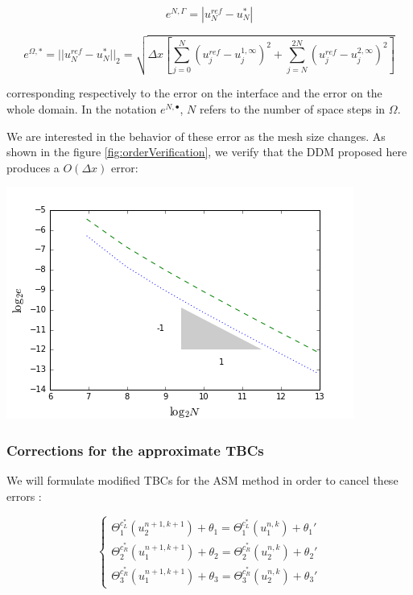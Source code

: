 \begin{equation}
	e^{N,\Gamma} = |u^{ref}_N - u^{*}_N|
\end{equation}

\begin{equation}
	\label{eq:errorDDM}
	e^{\Omega,*} = ||u^{ref}_N - u^{*}_N||_2 = \sqrt{\Delta x \left[ \sum_{j=0}^N{(u^{ref}_j - u^{1,\infty}_j)^2 } + \sum_{j=N}^{2N}{(u^{ref}_j - u^{2,\infty}_j)^2 } \right] }
\end{equation}

\noindent corresponding respectively to the error on the interface and the error on the whole domain. In the notation $e^{N,\bullet}$, $N$ refers to the number of space steps in $\Omega$.

\indent We are interested in the behavior of these error as the mesh size changes. As shown in the figure \ref{fig:orderVerification}, we verify that the DDM proposed here produces a $O(\Delta x)$ error:

\begingroup
\begin{center}
	\includegraphics[scale=.5]{figures/convergenceVerification.png}
\end{center}
\endgroup

\subsubsection{Corrections for the approximate TBCs}

\indent We will formulate modified TBCs for the ASM method in order to cancel these errors :

\begin{equation}
    \begin{cases}
        \Theta_1^{c_L^*}(u_2^{n+1,k+1}) + \theta_1 = \Theta_1^{c_L^*}(u_1^{n,k}) + \theta_1' \\
        \Theta_2^{c_R^*}(u_1^{n+1,k+1}) + \theta_2 = \Theta_2^{c_R^*}(u_2^{n,k}) + \theta_2' \\
        \Theta_3^{c_R^*}(u_1^{n+1,k+1}) + \theta_3 = \Theta_3^{c_R^*}(u_2^{n,k}) + \theta_3'
    \end{cases}
\end{equation}

